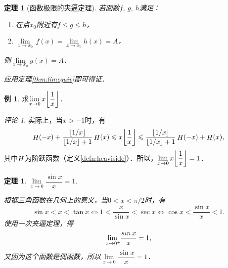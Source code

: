 \documentclass[a4paper,punct=CCT]{ctexbook}
\makeatletter
\renewcommand*{\enumparen}[1]{（\makebox[0.6em][c]{\normalfont#1}）}
\newtheorem{theorem}{定理}
\newtheorem*{theorem*}{定理}
\theoremstyle{definition}
\newtheorem*{example*}{例}
\theoremstyle{remark}
\newtheorem*{remark}{评论}
\renewenvironment{proof}[1][\proofname]{\par
  \pushQED{\qed}%
  \normalfont \topsep6\p@\@plus6\p@\relax
  \trivlist
  \item[]\ignorespaces
}{%
  \popQED\endtrivlist\@endpefalse
}
\let\leq\leqslant
\let\le\leq
\makeatother
\begin{document}
\begin{theorem}[函数极限的夹逼定理]
  \label{thm:funcsqueeze}
  若函数\(f,\ g,\ h\)满足：
  \begin{enumerate}[topsep=0ex,itemsep=0ex]
    \renewcommand{\labelenumi}{\enumparen{\arabic{enumi}}}
  \item 在点\(x_0\)附近有\(f \le g \le h\)，
  \item \(\lim\limits_{x \to x_0} \,f(x) = \lim\limits_{x \to x_0} h(x) = A\)，
  \end{enumerate}
  则\(\lim\limits_{x \to x_0} g(x) = A\)．

  \begin{proof}
    应用定理\ref{thm:limequiv}即可得证．
  \end{proof}
\end{theorem}

\begin{example*}
  求\(\lim\limits_{x\to0} x \floor[\bigg]{\dfrac1x}\)．

  \begin{remark}
    实际上，当\(x > -1\)时，有
    \begin{equation*}
      \Fn H(-x) + \frac{\floor{1/x}}{\floor{1/x}+1} \Fn H(x)
      \le
      x \floor[\bigg]{\dfrac1x}
      \le
      \frac{\floor{1/x}}{\floor{1/x}+1} \Fn H(-x) + \Fn H(x),
    \end{equation*}
    其中\(\Fn H\)为阶跃函数（定义\ref{defn:heaviside}）．所以，\(\lim\limits_{x\to0} x \floor[\bigg]{\dfrac1x} = 1\)．
  \end{remark}
\end{example*}

\begin{theorem*}
  \(\lim\limits_{x\to0} \dfrac{\sin x}{x} = 1\).

  \begin{proof}
    根据三角函数在几何上的意义，当\(0 < x < \pi/2\)时，有
    \begin{equation*}
      \sin x < x < \tan x
      \iff
      1 < \frac{x}{\sin x} < \sec x
      \iff
      \cos x < \frac{\sin x}{x} < 1.
    \end{equation*}
    使用一次夹逼定理，得
    \begin{equation*}
      \lim_{x\to0^+\negthickspace} \frac{\sin x}{x} = 1,
    \end{equation*}
    又因为这个函数是偶函数，所以\(\lim\limits_{x\to0} \dfrac{\sin x}{x} = 1\)．
  \end{proof}
\end{theorem*}
\end{document}
